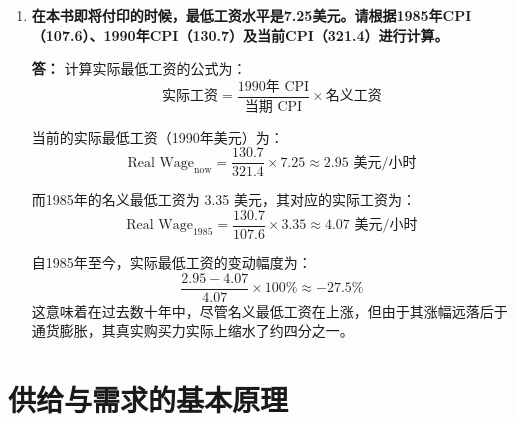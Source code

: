 \begin{enumerate}[label=\textbf{\arabic*.}, leftmargin=*]
		\newpage
		\item \textbf{在本书即将付印的时候，最低工资水平是7.25美元。请根据1985年CPI（107.6）、1990年CPI（130.7）及当前CPI（321.4）进行计算。}
		
		\textbf{答：}
		计算实际最低工资的公式为：
			$$ \text{实际工资} = \frac{\text{1990年 CPI}}{\text{当期 CPI}} \times \text{名义工资} $$
		
		当前的实际最低工资（1990年美元）为：
		$$ \text{Real Wage}_{\text{now}} = \frac{130.7}{321.4} \times 7.25 \approx 2.95 \text{ 美元/小时} $$
		
		而1985年的名义最低工资为 3.35 美元，其对应的实际工资为：
		$$ \text{Real Wage}_{1985} = \frac{130.7}{107.6} \times 3.35 \approx 4.07 \text{ 美元/小时} $$
		
		自1985年至今，实际最低工资的变动幅度为：
		$$ \frac{2.95 - 4.07}{4.07} \times 100\% \approx -27.5\% $$
		这意味着在过去数十年中，尽管名义最低工资在上涨，但由于其涨幅远落后于通货膨胀，其真实购买力实际上缩水了约四分之一。
		
	\end{enumerate}
	\chapter{供给与需求的基本原理}
